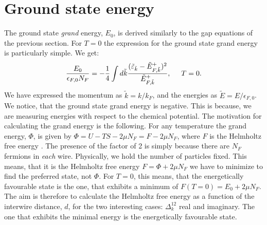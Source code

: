 \section{Ground state energy} \label{sec.groundstateenergy}
The ground state \textit{grand} energy, $E_0$, is derived similarly to the gap equations of the previous section. For $T = 0$ the expression for the ground state grand energy is particularly simple. We get:
\begin{equation}
\frac{E_0}{\epsilon_{F,0} N_F} = -\frac{1}{4} \int d\tilde{k} \frac{(\tilde{\varepsilon}_{\tilde{k}} - \tilde{E}^{+}_{F, \tilde{k}})^2}{\tilde{E}^{+}_{F, \tilde{k}}}, \hspace{0.5cm} T = 0. 
\label{eq.2wiresGrandGroundStateEnergy}
\end{equation}
We have expressed the momentum as $\tilde{k} = k/k_F$, and the energies as $\tilde{E} = E/\epsilon_{F,0}$. We notice, that the ground state grand energy is negative. This is because, we are measuring energies with respect to the chemical potential. The motivation for calculating the grand energy is the following. For any temperature the grand energy, $\Phi$, is given by $\Phi = U - TS - 2\mu N_F = F - 2\mu N_F$, where $F$ is the Helmholtz free energy \cite[pp. 161-162]{SchroederThermal}. The presence of the factor of 2 is simply because there are $N_F$ fermions in \textit{each} wire. Physically, we hold the number of particles fixed. This means, that it is the Helmholtz free energy $F = \Phi + 2\mu N_F$ we have to minimize to find the preferred state, not $\Phi$. For $T = 0$, this means, that the energetically favourable state is the one, that exhibits a minimum of $F(T = 0) = E_0 + 2\mu N_F$. The aim is therefore to calculate the Helmholtz free energy as a function of the interwire distance, $d$, for the two interesting cases: $\Delta^{12}_k$ real and imaginary. The one that exhibits the minimal energy is the energetically favourable state. 


